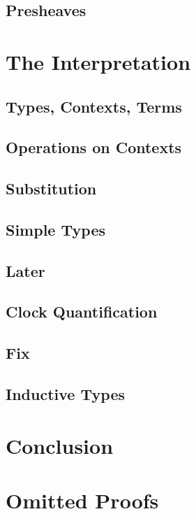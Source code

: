 \documentclass{amsart}
\begin{document}
\subsection{Presheaves}

\section{The Interpretation}

\subsection{Types, Contexts, Terms}

\subsection{Operations on Contexts}

\subsection{Substitution}

\subsection{Simple Types}

\subsection{Later}

\subsection{Clock Quantification}

\subsection{Fix}

\subsection{Inductive Types}

\section{Conclusion}

\appendix
\section{Omitted Proofs}





\end{document}
